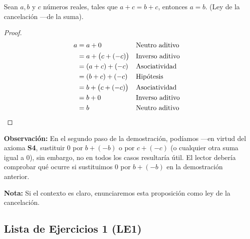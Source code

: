\documentclass[11pt]{article}
\begin{document}
Sean $a,b$ y $c$ números reales, tales que $a+c=b+c$, entonces $a=b$. (Ley de la cancelación —de la suma).

\vspace{-1em}\begin{proof} 
    \begin{align*}
        a &= a+0 && \text{Neutro aditivo}\\
        &= a+ \bigl(c+(-c)\bigr) && \text{Inverso aditivo}\\
        &= (a+c) + (-c) && \text{Asociatividad}\\
        &= (b+c) + (-c) && \text{Hipótesis}\\
        &= b + \bigl(c+(-c)\bigr) && \text{Asociatividad}\\
        &= b + 0 && \text{Inverso aditivo}\\
        &= b &&\text{Neutro aditivo} \qedhere
    \end{align*}    
\end{proof} \vspace{-1em}

\textbf{Observación:} En el segundo paso de la demostración, podíamos —en virtud del axioma \textbf{S4}, sustituir $0$ por $b+(-b)$ o por $c+(-c)$ (o cualquier otra suma igual a $0$), sin embargo, no en todos los casos resultaría útil. El lector debería comprobar qué ocurre si sustituimos $0$ por $b+(-b)$ en la demostración anterior.

\textbf{Nota:} Si el contexto es claro, enunciaremos esta proposición como ley de la cancelación.

\subsection*{Lista de Ejercicios 1 (LE1)}
\end{document}
